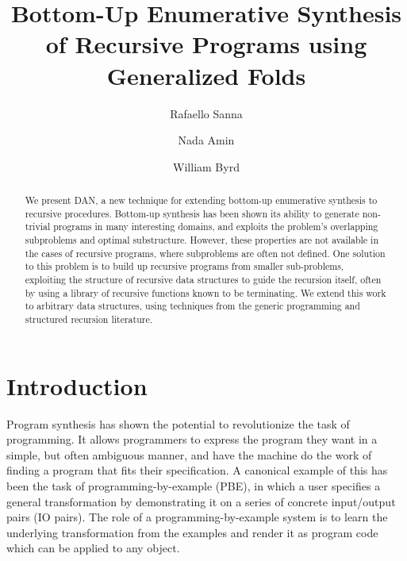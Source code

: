 \documentclass[acmsmall,screen]{acmart}
\begin{document}
\title{Bottom-Up Enumerative Synthesis of Recursive Programs using Generalized Folds}

\author{Rafaello Sanna}
\author{Nada Amin}
\author{William Byrd}

\renewcommand{\shortauthors}{Raffi Sanna, Nada Amin and Will Byrd}

\renewcommand\footnotetextcopyrightpermission[1]{}
\pagestyle{fancy}
\fancyfoot{}
\makeatletter
\let\@authorsaddresses\@empty
\makeatother

\begin{abstract}
    We present DAN, a new technique for extending bottom-up enumerative synthesis to recursive procedures. Bottom-up synthesis has been shown its ability to generate non-trivial programs in many interesting domains, and exploits the problem's overlapping subproblems and optimal substructure. However, these properties are not available in the cases of recursive programs, where subproblems are often not defined. One solution to this problem is to build up recursive programs from smaller sub-problems, exploiting the structure of recursive data structures to guide the recursion itself, often by using a library of recursive functions known to be terminating. We extend this work to arbitrary data structures, using techniques from the generic programming and structured recursion literature.
\end{abstract}


\maketitle
\thispagestyle{firstfancy}

\section{Introduction}

Program synthesis has shown the potential to revolutionize the task of programming. It allows programmers to express the program they want in a simple, but often ambiguous manner, and have the machine do the work of finding a program that fits their specification. A canonical example of this has been the task of programming-by-example (PBE), in which a user specifies a general transformation by demonstrating it on a series of concrete input/output pairs (IO pairs). The role of a programming-by-example system is to learn the underlying transformation from the examples and render it as program code which can be applied to any object.
\end{document}
